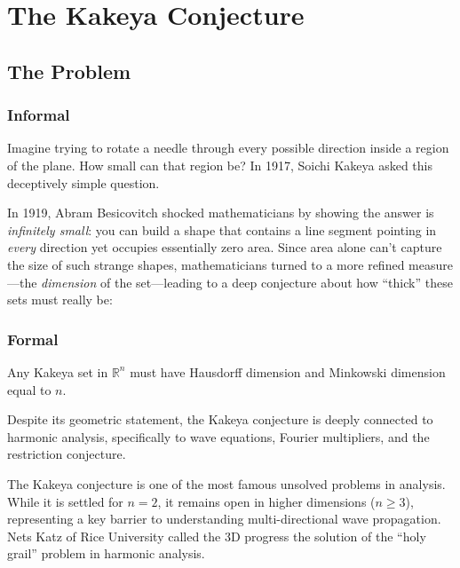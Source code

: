 \let\LocalMacro\relax

\chapter{The Kakeya Conjecture}

\section{The Problem}

\subsection{Informal}
Imagine trying to rotate a needle through every possible direction inside a region of the plane. How small can that region be? In 1917, Soichi Kakeya asked this deceptively simple question.

In 1919, Abram Besicovitch shocked mathematicians by showing the answer is \emph{infinitely small}: you can build a shape that contains a line segment pointing in \emph{every} direction yet occupies essentially zero area. Since area alone can't capture the size of such strange shapes, mathematicians turned to a more refined measure---the \emph{dimension} of the set---leading to a deep conjecture about how ``thick'' these sets must really be:

\subsection{Formal}
\begin{conjecture}
Any Kakeya set in $\mathbb{R}^n$ must have Hausdorff dimension and Minkowski dimension equal to $n$.
\end{conjecture}

Despite its geometric statement, the Kakeya conjecture is deeply connected to harmonic analysis, specifically to wave equations, Fourier multipliers, and the restriction conjecture.

\begin{historicalbox}
The Kakeya conjecture is one of the most famous unsolved problems in analysis. While it is settled for $n=2$, it remains open in higher dimensions ($n \geq 3$), representing a key barrier to understanding multi-directional wave propagation. Nets Katz of Rice University called the 3D progress the solution of the ``holy grail'' problem in harmonic analysis.
\end{historicalbox}

